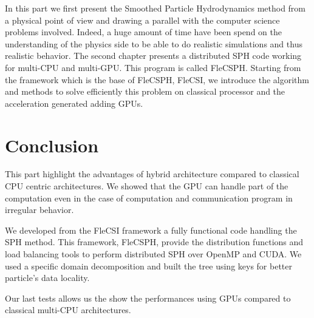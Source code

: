 In this part we first present the Smoothed Particle Hydrodynamics method from a physical point of view and drawing a parallel with the computer science problems involved. 
Indeed, a huge amount of time have been spend on the understanding of the physics side to be able to do realistic simulations and thus realistic behavior. 
The second chapter presents a distributed SPH code working for multi-CPU and multi-GPU. 
This program is called FleCSPH. 
Starting from the framework which is the base of FleCSPH, FleCSI, we introduce the algorithm and methods to solve efficiently this problem on classical processor and the acceleration generated adding GPUs. 







\chapter*{Conclusion}
This part highlight the advantages of hybrid architecture compared to classical CPU centric architectures. 
We showed that the GPU can handle part of the computation even in the case of computation and communication program in irregular behavior. 

We developed from the FleCSI framework a fully functional code handling the SPH method. 
This framework, FleCSPH, provide the distribution functions and load balancing tools to perform distributed SPH over OpenMP and CUDA.
We used a specific domain decomposition and built the tree using keys for better particle's data locality. 

Our last tests allows us the show the performances using GPUs compared to classical multi-CPU architectures. 
